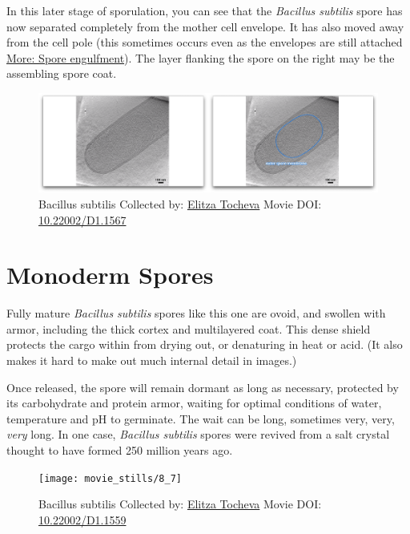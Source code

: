 \documentclass[]{tufte-book}
\begin{document}
In this later stage of sporulation, you can see that the \emph{Bacillus
subtilis} spore has now separated completely from the mother cell
envelope. It has also moved away from the cell pole (this sometimes
occurs even as the envelopes are still attached
\protect\hyperlink{Spore_engulfment}{More: Spore engulfment}). The layer
flanking the spore on the right may be the assembling spore coat.





\begin{figure}
\includegraphics{movie_stills/8_6b} \caption[Bacillus subtilis Collected by:
\protect\hyperlink{elitza_tocheva}{Elitza Tocheva} Movie DOI:
\href{https://doi.org/10.22002/D1.1567}{10.22002/D1.1567}]{Bacillus subtilis Collected by:
\protect\hyperlink{elitza_tocheva}{Elitza Tocheva} Movie DOI:
\href{https://doi.org/10.22002/D1.1567}{10.22002/D1.1567}}\label{fig:8-6b}
\end{figure}

\section{Monoderm Spores}\label{monoderm-spores}

Fully mature \emph{Bacillus subtilis} spores like this one are ovoid,
and swollen with armor, including the thick cortex and multilayered
coat. This dense shield protects the cargo within from drying out, or
denaturing in heat or acid. (It also makes it hard to make out much
internal detail in images.)

Once released, the spore will remain dormant as long as necessary,
protected by its carbohydrate and protein armor, waiting for optimal
conditions of water, temperature and pH to germinate. The wait can be
long, sometimes very, very, \emph{very} long. In one case,
\emph{Bacillus subtilis} spores were revived from a salt crystal thought
to have formed 250 million years ago.





\begin{figure}
\texttt{[image: movie\_stills/8\_7]} \caption[Bacillus subtilis Collected by:
\protect\hyperlink{elitza_tocheva}{Elitza Tocheva} Movie DOI:
\href{https://doi.org/10.22002/D1.1559}{10.22002/D1.1559}]{Bacillus subtilis Collected by:
\protect\hyperlink{elitza_tocheva}{Elitza Tocheva} Movie DOI:
\href{https://doi.org/10.22002/D1.1559}{10.22002/D1.1559}}\label{fig:8-7}
\end{figure}
\end{document}

